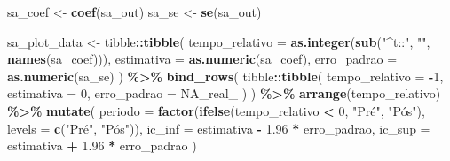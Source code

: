 \documentclass[
]{article}
\newenvironment{Shaded}{\begin{snugshade}}{\end{snugshade}}
\newcommand{\AttributeTok}[1]{\textcolor[rgb]{0.13,0.29,0.53}{#1}}
\newcommand{\ConstantTok}[1]{\textcolor[rgb]{0.56,0.35,0.01}{#1}}
\newcommand{\DecValTok}[1]{\textcolor[rgb]{0.00,0.00,0.81}{#1}}
\newcommand{\FloatTok}[1]{\textcolor[rgb]{0.00,0.00,0.81}{#1}}
\newcommand{\FunctionTok}[1]{\textcolor[rgb]{0.13,0.29,0.53}{\textbf{#1}}}
\newcommand{\NormalTok}[1]{#1}
\newcommand{\OtherTok}[1]{\textcolor[rgb]{0.56,0.35,0.01}{#1}}
\newcommand{\SpecialCharTok}[1]{\textcolor[rgb]{0.81,0.36,0.00}{\textbf{#1}}}
\newcommand{\StringTok}[1]{\textcolor[rgb]{0.31,0.60,0.02}{#1}}
\begin{document}
\begin{Shaded}
\begin{Highlighting}[]
\NormalTok{sa\_coef }\OtherTok{\textless{}{-}} \FunctionTok{coef}\NormalTok{(sa\_out)}
\NormalTok{sa\_se }\OtherTok{\textless{}{-}} \FunctionTok{se}\NormalTok{(sa\_out)}

\NormalTok{sa\_plot\_data }\OtherTok{\textless{}{-}}\NormalTok{ tibble}\SpecialCharTok{::}\FunctionTok{tibble}\NormalTok{(}
  \AttributeTok{tempo\_relativo =} \FunctionTok{as.integer}\NormalTok{(}\FunctionTok{sub}\NormalTok{(}\StringTok{"\^{}t::"}\NormalTok{, }\StringTok{""}\NormalTok{, }\FunctionTok{names}\NormalTok{(sa\_coef))),}
  \AttributeTok{estimativa =} \FunctionTok{as.numeric}\NormalTok{(sa\_coef),}
  \AttributeTok{erro\_padrao =} \FunctionTok{as.numeric}\NormalTok{(sa\_se)}
\NormalTok{) }\SpecialCharTok{\%\textgreater{}\%}
  \FunctionTok{bind\_rows}\NormalTok{(}
\NormalTok{    tibble}\SpecialCharTok{::}\FunctionTok{tibble}\NormalTok{(}
      \AttributeTok{tempo\_relativo =} \SpecialCharTok{{-}}\DecValTok{1}\NormalTok{,}
      \AttributeTok{estimativa =} \DecValTok{0}\NormalTok{,}
      \AttributeTok{erro\_padrao =} \ConstantTok{NA\_real\_}
\NormalTok{    )}
\NormalTok{  ) }\SpecialCharTok{\%\textgreater{}\%}
  \FunctionTok{arrange}\NormalTok{(tempo\_relativo) }\SpecialCharTok{\%\textgreater{}\%}
  \FunctionTok{mutate}\NormalTok{(}
    \AttributeTok{periodo =} \FunctionTok{factor}\NormalTok{(}\FunctionTok{ifelse}\NormalTok{(tempo\_relativo }\SpecialCharTok{\textless{}} \DecValTok{0}\NormalTok{, }\StringTok{"Pré"}\NormalTok{, }\StringTok{"Pós"}\NormalTok{), }\AttributeTok{levels =} \FunctionTok{c}\NormalTok{(}\StringTok{"Pré"}\NormalTok{, }\StringTok{"Pós"}\NormalTok{)),}
    \AttributeTok{ic\_inf =}\NormalTok{ estimativa }\SpecialCharTok{{-}} \FloatTok{1.96} \SpecialCharTok{*}\NormalTok{ erro\_padrao,}
    \AttributeTok{ic\_sup =}\NormalTok{ estimativa }\SpecialCharTok{+} \FloatTok{1.96} \SpecialCharTok{*}\NormalTok{ erro\_padrao}
\NormalTok{  )}


\end{Highlighting}
\end{Shaded}
\end{document}

